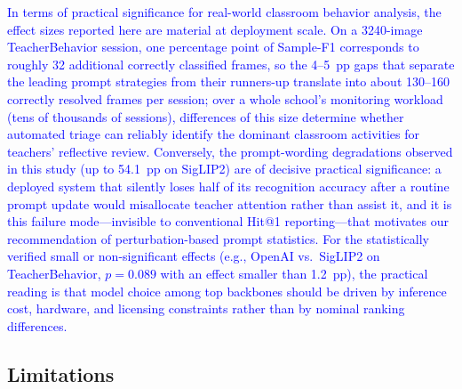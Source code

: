 \documentclass[symmetry,article,submit,pdftex,moreauthors]{Definitions/mdpi}
\newcommand{\rev}[1]{\textcolor{blue}{#1}}
\begin{document}
\rev{In terms of practical significance for real-world classroom behavior analysis, the effect sizes reported here are material at deployment scale. On a 3240-image TeacherBehavior session, one percentage point of Sample-F1 corresponds to roughly 32 additional correctly classified frames, so the 4--5~pp gaps that separate the leading prompt strategies from their runners-up translate into about 130--160 correctly resolved frames per session; over a whole school's monitoring workload (tens of thousands of sessions), differences of this size determine whether automated triage can reliably identify the dominant classroom activities for teachers' reflective review. Conversely, the prompt-wording degradations observed in this study (up to 54.1~pp on SigLIP2) are of decisive practical significance: a deployed system that silently loses half of its recognition accuracy after a routine prompt update would misallocate teacher attention rather than assist it, and it is this failure mode---invisible to conventional Hit@1 reporting---that motivates our recommendation of perturbation-based prompt statistics. For the statistically verified small or non-significant effects (e.g., OpenAI vs.\ SigLIP2 on TeacherBehavior, $p=0.089$ with an effect smaller than 1.2~pp), the practical reading is that model choice among top backbones should be driven by inference cost, hardware, and licensing constraints rather than by nominal ranking differences.}

\subsection{Limitations}
\end{document}
